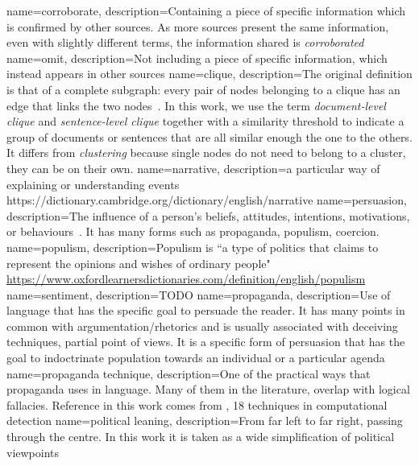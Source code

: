 {
        name=corroborate,
        description={Containing a piece of specific information which is confirmed by other sources. As more sources present the same information, even with slightly different terms, the information shared is \emph{corroborated}}
}
{
        name=omit,
        description={Not including a piece of specific information, which instead appears in other sources}
}
{
        name=clique,
        description={The original definition is that of a complete subgraph: every pair of nodes belonging to a clique has an edge that links the two nodes~\citep{luce1949method}. In this work, we use the term \emph{document-level clique} and \emph{sentence-level clique} together with a similarity threshold to indicate a group of documents or sentences that are all similar enough the one to the others. It differs from \emph{clustering} because single nodes do not need to belong to a cluster, they can be on their own.}
}
{
        name=narrative,
        description={a particular way of explaining or understanding events 
            https://dictionary.cambridge.org/dictionary/english/narrative
        }
}
{
        name=persuasion,
        description={The influence of a person's beliefs, attitudes, intentions, motivations, or behaviours~\cite{gass2018persuasion}. It has many forms such as \gls{propaganda}, \gls{populism}, coercion.}
}
{
        name=populism,
        description={Populism is ``a type of politics that claims to represent the opinions and wishes of ordinary people" \url{https://www.oxfordlearnersdictionaries.com/definition/english/populism}}
}
{
        name=sentiment,
        description={TODO}
}
{
        name=propaganda,
        description={Use of language that has the specific goal to persuade the reader. It has many points in common with argumentation/rhetorics and is usually associated with deceiving techniques, partial point of views. It is a specific form of persuasion that has the goal to indoctrinate population towards an individual or a particular agenda}
}
{
        name=propaganda technique,
        description={One of the practical ways that propaganda uses in language. Many of them in the literature, overlap with logical fallacies. Reference in this work comes from \cite{TODO}, 18 techniques in computational detection}
}
{
        name=political leaning,
        description={From far left to far right, passing through the centre. In this work it is taken as a wide simplification of political viewpoints}
}
